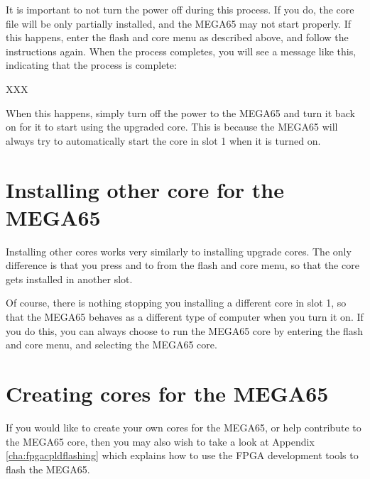 It is important to not turn the power off during this process. If you do, the core file will be
only partially installed, and the MEGA65 may not start properly. If this happens, enter the flash and core
menu as described above, and follow the instructions again.  When the process completes, you will see a message
like this, indicating that the process is complete:

XXX

When this happens, simply turn off the power to the MEGA65 and turn it back on for it to start using the
upgraded core.  This is because the MEGA65 will always try to automatically start the core in slot 1 when
it is turned on.

\section{Installing other core for the MEGA65}

Installing other cores works very similarly to installing upgrade cores. The only difference is that you
press  and  to  from the flash and core menu, so that the core
gets installed in another slot.

Of course, there is nothing stopping you installing a different core
in slot 1, so that the MEGA65 behaves as a different type of computer when you turn it on.  If you do this,
you can always choose to run the MEGA65 core by entering the flash and core menu,  and selecting the MEGA65
core.

\section{Creating cores for the MEGA65}

If you would like to create your own cores for the MEGA65, or help contribute to the MEGA65 core, then
you may also wish to take a look at Appendix \ref{cha:fpgacpldflashing} which explains how to use the
FPGA development tools to flash the MEGA65.



